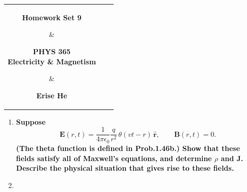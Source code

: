 \documentclass[12pt]{article}
\begin{document}
\thispagestyle{plain}
\vspace{-4ex}  %


\begin{center}
\begin{tabular}{*{3}{c}}
    \parbox[t]{0.3\linewidth}{\centering\textbf{Homework Set 9}}
    & \parbox[t]{0.3\linewidth}{\centering\textbf{PHYS 365\\Electricity \& Magnetism}}
    & \parbox[t]{0.3\linewidth}{\centering\textbf{Erise He}}\\[2em]
    \hline
\end{tabular}
\end{center}

\bigskip

\begin{enumerate}
    \item[P7.39] \textbf{Suppose}
  \[
  \mathbf{E}(r,t)=\frac{1}{4\pi\epsilon_0}\frac{q}{r^2}\,\theta(vt-r)\,\hat{\mathbf{r}},
  \qquad
  \mathbf{B}(r,t)=0.
  \]
  \textbf{(The theta function is defined in Prob.1.46b.) Show that these fields satisfy all of Maxwell's equations, and determine $\rho$ and $\mathbf{J}$. Describe the physical situation that gives rise to these fields.}


\item[Solution] 



\end{enumerate}
\end{document}
